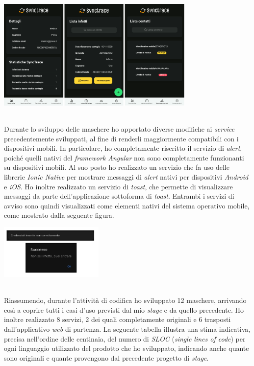 \begin{minipage}{\linewidth}
  \centering
    \includegraphics[height=5.5cm]{immagini/app/med}
\end{minipage}\\

Durante lo sviluppo delle maschere ho apportato diverse modifiche ai \textit{service} precedentemente sviluppati, al fine di renderli maggiormente compatibili con i dispositivi mobili. In particolare, ho completamente riscritto il servizio di \textit{alert}, poiché quelli nativi del \textit{framework Angular} non sono completamente funzionanti su dispositivi mobili. Al suo posto ho realizzato un servizio che fa uso delle librerie \textit{Ionic Native} per mostrare messaggi di \textit{alert} nativi per dispositivi \textit{Android} e \textit{iOS}. Ho inoltre realizzato un servizio di \textit{toast}, che permette di visualizzare messaggi da parte dell'applicazione sottoforma di \textit{toast}. Entrambi i servizi di avviso sono quindi visualizzati come elementi nativi del sistema operativo mobile, come mostrato dalla seguente figura. \\

\begin{minipage}{\linewidth}
  \centering
    \includegraphics[height=2.7cm]{immagini/app/alert}
\end{minipage} \\

Riassumendo, durante l'attività di codifica ho sviluppato 12 maschere, arrivando così a coprire tutti i casi d'uso previsti dal mio \textit{stage} e da quello precedente. Ho inoltre realizzato 8 servizi, 2 dei quali completamente originali e 6 trasposti dall'applicativo \textit{web} di partenza. La seguente tabella illustra una stima indicativa, precisa nell'ordine delle centinaia, del numero di \textit{SLOC} (\textit{single lines of code}) per ogni linguaggio utilizzato del prodotto che ho sviluppato, indicando anche quante sono originali e quante provengono dal precedente progetto di \textit{stage}.

